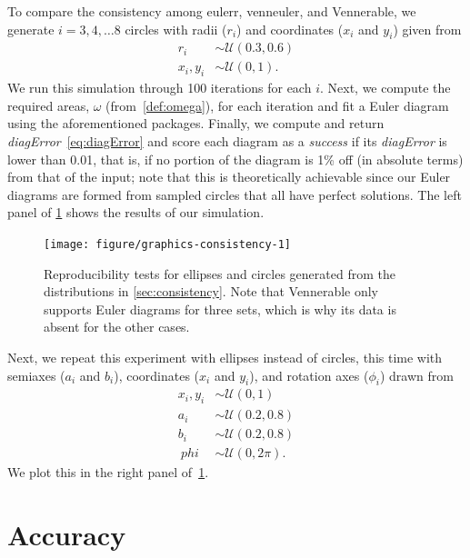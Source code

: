 \documentclass[
  a4paper,
  nofonts,
  nobib,
  titlepage,
  justified,
  marginals=raggedouter,
  nohyper
]{tufte-handout}\usepackage[]{graphicx}\usepackage[]{color}
\newenvironment{knitrout}{}{} %
\newcommand{\pkg}[1]{{\fontseries{b}\selectfont #1}}
\begin{document}
To compare the consistency among \pkg{eulerr}, \pkg{venneuler}, and
\pkg{Vennerable}, we generate $i=3,4,\dots 8$ circles with radii ($r_i$) and
coordinates ($x_i$ and $y_i$) given from
\begin{align*}
r_i     & \sim \mathcal{U}(0.3, 0.6)\\
x_i,y_i & \sim \mathcal{U}(0, 1).
\end{align*}
We run this simulation through 100 iterations for each $i$. Next, we compute the
required areas, $\omega$ (from~\cref{def:omega}), for each iteration and
fit a Euler diagram using the aforementioned packages. Finally,
we compute and return \emph{diagError}~\eqref{eq:diagError} and score each
diagram as a \emph{success} if its \emph{diagError} is lower than 0.01, that is,
if no portion of the diagram is 1\% off (in absolute terms) from that of the
input; note that this is theoretically achievable since our Euler diagrams are
formed from sampled circles that all have perfect solutions. The left panel of
\cref{fig:consistency} shows the results of our simulation.
%
\begin{figure}[hbtp!]
\begin{knitrout}
\color{fgcolor}

{\centering \texttt{[image: figure/graphics-consistency-1]} 

}



\end{knitrout}
\caption{Reproducibility tests for ellipses and circles generated from the distributions in \cref{sec:consistency}. Note that \pkg{Vennerable} only supports Euler diagrams for three sets, which is why its data is absent for the other cases.}
\label{fig:consistency}
\end{figure}
%
Next, we repeat this experiment with ellipses instead of
circles, this time with semiaxes ($a_i$ and $b_i$), coordinates
($x_i$ and $y_i$), and rotation axes ($\phi_i$) drawn from
\begin{align*}
x_i,y_i & \sim \mathcal{U}(0, 1)\\
a_i     & \sim \mathcal{U}(0.2, 0.8)\\
b_i     & \sim \mathcal{U}(0.2, 0.8)\\\
phi     & \sim \mathcal{U}(0, 2\pi).
\end{align*}
We plot this in the right panel of~\cref{fig:consistency}.

\section{Accuracy}
\label{sec:accuracy}
\end{document}
